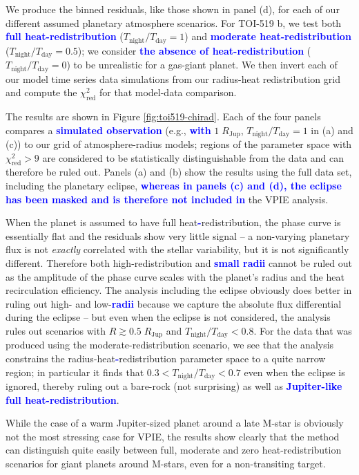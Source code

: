 \documentclass[twocolumn,linenumbers]{aastex7}
\newcommand{\update}[1]{\textcolor{blue}{\bf #1}}
\begin{document}
We produce the binned residuals, like those shown in panel (d), for each of our different assumed planetary atmosphere scenarios. For TOI-519 b, we test both \update{full heat-redistribution} ($T_\mathrm{night}/T_\mathrm{day}=1$) and \update{moderate heat-redistribution} ($T_\mathrm{night}/T_\mathrm{day}=0.5$); we consider \update{the absence of heat-redistribution} ($T_\mathrm{night}/T_\mathrm{day}=0$) to be unrealistic for a gas-giant planet. We then invert each of our model time series data simulations from our radius-heat redistribution grid and compute the $\chi^2_\mathrm{red}$ for that model-data comparison.

The results are shown in Figure \ref{fig:toi519-chirad}. Each of the four panels compares a \update{simulated observation} (e.g., \update{with} $1\;R_\mathrm{Jup}$, $T_\mathrm{night}/T_\mathrm{day}=1$ in (a) and (c)) to our grid of atmosphere-radius models; regions of the parameter space with $\chi^2_\mathrm{red} > 9$ are considered to be statistically distinguishable from the data and can therefore be ruled out. Panels (a) and (b) show the results using the full data set, including the planetary eclipse, \update{whereas in panels (c) and (d), the eclipse has been masked and is therefore not included in} the VPIE analysis. 

When the planet is assumed to have full heat\update{-}redistribution, the phase curve is essentially flat and the residuals show very little signal -- a non-varying planetary flux is not \textit{exactly} correlated with the stellar variability, but it is not significantly different. Therefore both high-redistribution and \update{small radii} cannot be ruled out as the amplitude of the phase curve scales with the planet's radius and the heat recirculation efficiency. The analysis including the eclipse obviously does better in ruling out high- and low-\update{radii} because we capture the absolute flux differential during the eclipse -- but even when the eclipse is not considered, the analysis rules out scenarios with $R\gtrsim0.5\;R_\mathrm{Jup}$ and $T_\mathrm{night}/T_\mathrm{day}<0.8$. For the data that was produced using the moderate-redistribution scenario, we see that the analysis constrains the radius-heat\update{-}redistribution parameter space to a quite narrow region; in particular it finds that $0.3<T_\mathrm{night}/T_\mathrm{day}<0.7$ even when the eclipse is ignored, thereby ruling out a bare-rock (not surprising) as well as \update{Jupiter-like full heat-redistribution}. 

While the case of a warm Jupiter-sized planet around a late M-star is obviously not the most stressing case for VPIE, the results show clearly that the method can distinguish quite easily between full, moderate and zero heat-redistribution scenarios for giant planets around M-stars, even for a non-transiting target.
\end{document}
